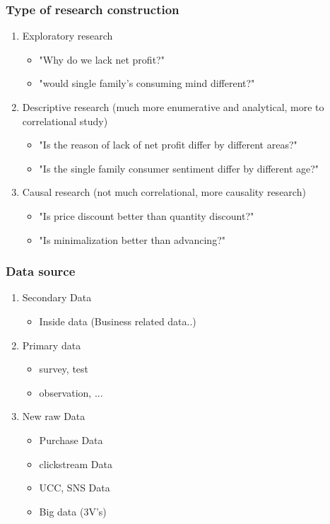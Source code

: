 \documentclass[12pt]{article}
\begin{document}
\subsubsection{Type of research construction}
\begin{enumerate}
	\item Exploratory research
	\begin{itemize}
		\item "Why do we lack net profit?"
		\item "would single family's consuming mind different?"
	\end{itemize}
	\item Descriptive research (much more enumerative and analytical, more to correlational study)
	\begin{itemize}
		\item "Is the reason of lack of net profit differ by different areas?"
		\item "Is the single family consumer sentiment differ by different age?"
	\end{itemize}
	\item Causal research (not much correlational, more causality research)
	\begin{itemize}
		\item "Is price discount better than quantity discount?"
		\item "Is minimalization better than advancing?"
	\end{itemize}

\end{enumerate}
\subsubsection{Data source}
\begin{enumerate}
	\item Secondary Data
	\begin{itemize}
		\item Inside data (Business related data..)
	\end{itemize}
	\item Primary data
	\begin{itemize}
		\item survey, test
		\item observation, ...
	\end{itemize}
	\item New raw Data
	\begin{itemize}
		\item Purchase Data
		\item clickstream Data
		\item UCC, SNS Data
		\item Big data (3V's)
	\end{itemize}
\end{enumerate}
\end{document}
